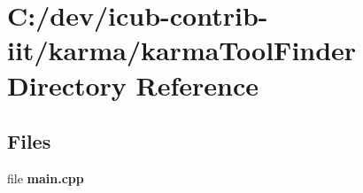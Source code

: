 \section{C\+:/dev/icub-\/contrib-\/iit/karma/karma\+Tool\+Finder Directory Reference}
\label{dir_fc2ca9d819584877a4ee7a1c7aa95e29}
\subsection*{Files}
\begin{DoxyCompactItemize}
\item 
file {\bfseries main.\+cpp}
\end{DoxyCompactItemize}

